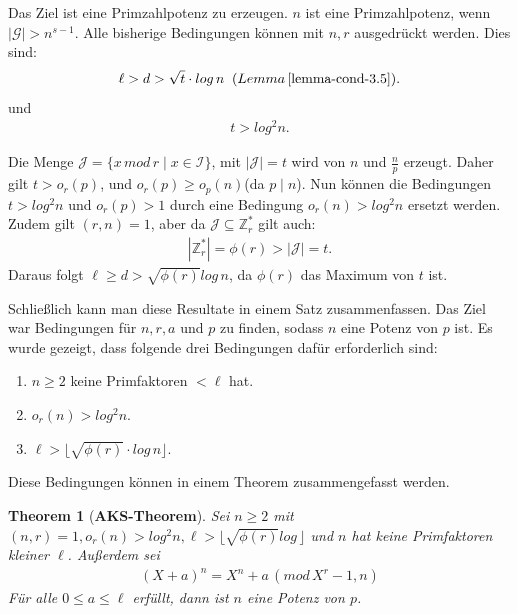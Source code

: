 \documentclass[12pt,oneside]{article}
\newtheorem{theorem}{Theorem}[section]
\theoremstyle{remark}
\theoremstyle{definition}
\begin{document}
\begin{flushleft}
Das Ziel ist eine Primzahlpotenz zu erzeugen. $n$ ist eine Primzahlpotenz, wenn $|\mathcal{G}| > n^{s - 1}$. Alle bisherige Bedingungen können mit $n,r$ ausgedrückt werden. Dies sind:
\begin{align*}
    \ell > d > \sqrt{t} \cdot log \, n \; \;  (Lemma \,  \ref{lemma-cond-3.5}).
\end{align*}
und 
\begin{align*}
    t > log^2 n.
\end{align*}


Die Menge $\mathcal{J} = \{ x \, mod \, r \mid x \in \mathcal{I} \}$, mit $|\mathcal{J}| = t$ wird von $n$ und $\frac{n}{p}$ erzeugt. Daher gilt $ t > o_{r}(p)$, und  $o_{r}(p) \geq o_{p}(n)$(da $p \mid n$). Nun können die Bedingungen $t > log^2n$ und $o_{r}(p) > 1$ durch eine Bedingung $o_{r}(n) > log^2 n$ ersetzt werden. Zudem gilt $(r,n) = 1$, aber da $\mathcal{J} \subseteq \mathbb{Z}_{r}^{*}$ gilt auch:
\begin{align*}
    |\mathbb{Z}_r^{*}| = \phi(r) > |\mathcal{J}| = t. 
\end{align*}
Daraus folgt $\ell \geq d > \sqrt{\phi(r)} log \, n$, da $\phi(r)$ das Maximum von $t$ ist.

Schließlich kann man diese Resultate in einem Satz zusammenfassen. Das Ziel war Bedingungen für $n,r,a$ und $p$ zu finden, sodass $n$ eine Potenz von $p$ ist. Es wurde gezeigt, dass folgende drei Bedingungen dafür erforderlich sind:
\begin{enumerate}
    \item $n \geq 2$ keine Primfaktoren $< \ell$ hat.\newline
    
    \item $o_{r}(n) > log^2 n$.\newline
    
    \item $\ell > \lfloor \sqrt{\phi(r)} \cdot log \, n \rfloor $.\newline\newline
\end{enumerate}

Diese Bedingungen können in einem Theorem zusammengefasst werden.

\begin{theorem}[\textbf{AKS-Theorem}]\label{aks-main-theorem}
Sei $n \geq 2$ mit $(n,r) = 1, o_{r}(n) > log^2 n ,\ell > \lfloor \sqrt{\phi(r)} log \, \rfloor$ und $n$ hat keine Primfaktoren kleiner $\ell$. Außerdem sei
\begin{align*}
    (X + a)^n = X^n + a \, (mod  \, X^r - 1, n)
\end{align*}
Für alle $0 \leq a \leq \ell$ erfüllt, dann ist $n$ eine Potenz von $p$.
\end{theorem}


\end{flushleft}
\end{document}
